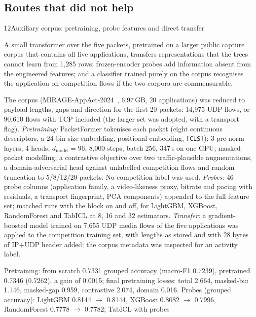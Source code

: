 \subsection{Routes that did not help}

 
\begin{explog}{12}{Auxiliary corpus: pretraining, probe features and direct transfer}
\item[Hypothesis] A small transformer over the five packets, pretrained on a larger public
capture corpus that contains all five applications, transfers representations that
the trees cannot learn from 1{,}285 rows; frozen-encoder probes add information
absent from the engineered features; and a classifier trained purely on the corpus
recognises the application on competition flows if the two corpora are
commensurable.
\item[Method] The corpus (MIRAGE-AppAct-2024~\cite{mirage}, 6.97\,GB, 20 applications) was reduced to
payload lengths, gaps and direction for the first 20 packets: 14{,}975 UDP flows,
or 90{,}610 flows with TCP included (the larger set was adopted, with a transport
flag). \emph{Pretraining:} PacketFormer tokenises each packet (eight continuous
descriptors, a 24-bin size embedding, positional embedding, \texttt{[CLS]}); 3
pre-norm layers, 4 heads, $d_\mathrm{model}=96$; 8{,}000 steps, batch 256, 347\,s on
one GPU; masked-packet modelling, a contrastive objective over two traffic-plausible
augmentations, a domain-adversarial head against unlabelled competition flows and
random truncation to 5/8/12/20 packets. No competition label was used.
\emph{Probes:} 46 probe columns (application family, a video-likeness proxy,
bitrate and pacing with residuals, a transport fingerprint, PCA components) appended
to the full feature set; matched runs with the block on and off, for LightGBM,
XGBoost, RandomForest and TabICL at 8, 16 and 32 estimators. \emph{Transfer:} a
gradient-boosted model trained on 7{,}655 UDP media flows of the five applications
was applied to the competition training set, with lengths as stored and with 28
bytes of IP+UDP header added; the corpus metadata was inspected for an activity
label.
\item[Result] Pretraining: from scratch 0.7331 grouped accuracy (macro-F1 0.7239),
pretrained 0.7346 (0.7262), a gain of 0.0015; final pretraining losses: total
2.664, masked-bin 1.146, masked-gap 0.959, contrastive 2.074, domain 0.016. Probes
(grouped accuracy): LightGBM 0.8144 $\rightarrow$ 0.8144, XGBoost 0.8082
$\rightarrow$ 0.7996, RandomForest 0.7778 $\rightarrow$ 0.7782; TabICL with probes

\end{explog}
